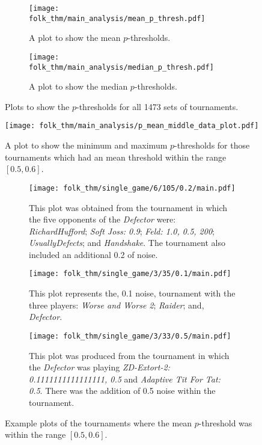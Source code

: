 \begin{figure}
    \begin{subfigure}{.45\textwidth}
        \centering
        \texttt{[image: folk\_thm/main\_analysis/mean\_p\_thresh.pdf]}
        \caption{A plot to show the mean \(p\)-thresholds.}\label{subfig:mean_p_thresh}
    \end{subfigure}
    \begin{subfigure}{.45\textwidth}
        \centering
        \texttt{[image: folk\_thm/main\_analysis/median\_p\_thresh.pdf]}
        \caption{A plot to show the median \(p\)-thresholds.}\label{subfig:median_p_thresh}
    \end{subfigure}
    \caption{Plots to show the \(p\)-thresholds for all 1473 sets of tournaments.}\label{fig:mean_median_p_thresh}
\end{figure}


\begin{figure}
    \centering
    \texttt{[image: folk\_thm/main\_analysis/p\_mean\_middle\_data\_plot.pdf]}
    \caption{A plot to show the minimum and maximum \(p\)-thresholds for those tournaments which had an mean threshold within the range \([0.5, 0.6]\).}\label{fig:fig:p_mean_middle_plot}
\end{figure}


\begin{figure}
    \begin{subfigure}{0.3\textwidth}
        \centering
        \texttt{[image: folk\_thm/single\_game/6/105/0.2/main.pdf]}
        \caption{This plot was obtained from the tournament in which the five
        opponents of the \textit{Defector} were: \textit{RichardHufford};
        \textit{Soft Joss: 0.9}; \textit{Feld: 1.0, 0.5, 200};
        \textit{UsuallyDefects}; and \textit{Handshake}. The tournament also included an additional 0.2 of noise.}
    \end{subfigure}
    \begin{subfigure}{0.3\textwidth}
        \centering
        \texttt{[image: folk\_thm/single\_game/3/35/0.1/main.pdf]}
        \caption{This plot represents the, 0.1 noise, tournament with the three players: \textit{Worse and Worse 2}; \textit{Raider}; and, \textit{Defector}.}
    \end{subfigure}
    \begin{subfigure}{0.3\textwidth}
        \centering
        \texttt{[image: folk\_thm/single\_game/3/33/0.5/main.pdf]}
        \caption{This plot was produced from the tournament in which the \textit{Defector} was playing \textit{ZD-Extort-2: 0.1111111111111111, 0.5} and \textit{Adaptive Tit For Tat: 0.5}. There was the addition of 0.5 noise within the tournament.}
    \end{subfigure}
    \caption{Example plots of the tournaments where the mean \(p\)-threshold was within the range \([0.5, 0.6]\).}\label{fig:mean_middle_specific}
\end{figure}



